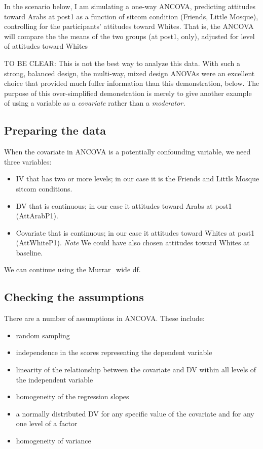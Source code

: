 \documentclass[
  11pt,
]{book}
\providecommand{\tightlist}{%
  \setlength{\itemsep}{0pt}\setlength{\parskip}{0pt}}
\begin{document}
In the scenario below, I am simulating a one-way ANCOVA, predicting attitudes toward Arabs at post1 as a function of sitcom condition (Friends, Little Mosque), controlling for the participants' attitudes toward Whites. That is, the ANCOVA will compare the the means of the two groups (at post1, only), adjusted for level of attitudes toward Whites

TO BE CLEAR: This is not the best way to analyze this data. With such a strong, balanced design, the multi-way, mixed design ANOVAs were an excellent choice that provided much fuller information than this demonstration, below. The purpose of this over-simplified demonstration is merely to give another example of using a variable as a \emph{covariate} rather than a \emph{moderator.}

\hypertarget{preparing-the-data-2}{%
\subsection{Preparing the data}\label{preparing-the-data-2}}

When the covariate in ANCOVA is a potentially confounding variable, we need three variables:

\begin{itemize}
\tightlist
\item
  IV that has two or more levels; in our case it is the Friends and Littls Mosque sitcom conditions.
\item
  DV that is continuous; in our case it attitudes toward Arabs at post1 (AttArabP1).
\item
  Covariate that is continuous; in our case it attitudes toward Whites at post1 (AttWhiteP1). \emph{Note} We could have also chosen attitudes toward Whites at baseline.
\end{itemize}

We can continue using the Murrar\_wide df.

\hypertarget{checking-the-assumptions-1}{%
\subsection{Checking the assumptions}\label{checking-the-assumptions-1}}

There are a number of assumptions in ANCOVA. These include:

\begin{itemize}
\tightlist
\item
  random sampling
\item
  independence in the scores representing the dependent variable
\item
  linearity of the relationship between the covariate and DV within all levels of the independent variable
\item
  homogeneity of the regression slopes
\item
  a normally distributed DV for any specific value of the covariate and for any one level of a factor
\item
  homogeneity of variance
\end{itemize}
\end{document}

